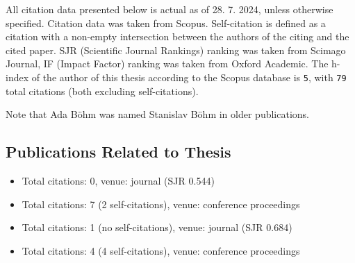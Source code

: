 All citation data presented below is actual as of 28. 7. 2024, unless otherwise
            specified. Citation data was taken from Scopus.
Self-citation is defined as a citation with a non-empty intersection between the authors of the citing and the cited paper.
SJR (Scientific Journal Rankings) ranking was taken from Scimago Journal,
IF (Impact Factor) ranking was taken from Oxford Academic.
The h-index of the author of this thesis according to the Scopus database is \texttt{5},
with \texttt{79} total citations (both excluding self-citations).

Note that Ada Böhm was named Stanislav Böhm in older publications.

\begin{refsection}
\renewcommand*{\mkbibnamegiven}[1]{%
	\ifitemannotation{highlight}
	{\textbf{#1}}
	{#1}}

\renewcommand*{\mkbibnamefamily}[1]{%
	\ifitemannotation{highlight}
	{\textbf{#1}}
	{#1}}

\section*{Publications Related to Thesis}
	\begin{itemize}
		\item{}\par{}Total citations: 0, venue: journal (SJR 0.544)
		\item{}\par{}Total citations: 7 (2 self-citations), venue: conference proceedings
		\item{}\par{}Total citations: 1 (no self-citations), venue: journal (SJR 0.684)
		\item{}\par{}Total citations: 4 (4 self-citations), venue: conference proceedings
	\end{itemize}


\end{refsection}
